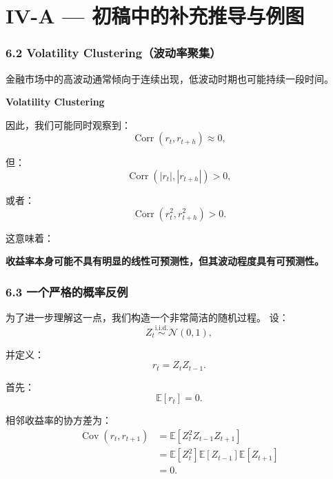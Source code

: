 \hypertarget{part-4-52-0680-iv-a-ux521dux7a3fux4e2dux7684ux8865ux5145ux63a8ux5bfcux4e0eux4f8bux56fe}{%
\section{IV-A --- 初稿中的补充推导与例图}\label{part-4-52-0680-iv-a-ux521dux7a3fux4e2dux7684ux8865ux5145ux63a8ux5bfcux4e0eux4f8bux56fe}}

\hypertarget{part-4-52-0680-volatility-clusteringux6ce2ux52a8ux7387ux805aux96c6}{%
\subsubsection{6.2 Volatility Clustering（波动率聚集）}\label{part-4-52-0680-volatility-clusteringux6ce2ux52a8ux7387ux805aux96c6}}

金融市场中的高波动通常倾向于连续出现，低波动时期也可能持续一段时间。

\textbf{Volatility Clustering}


因此，我们可能同时观察到：
\[\operatorname{Corr}(r_t,r_{t+h})\approx0,\]

但：
\[\operatorname{Corr}(|r_t|,|r_{t+h}|)>0,\]

或者：
\[\operatorname{Corr}(r_t^2,r_{t+h}^2)>0.\]

这意味着：

\textbf{收益率本身可能不具有明显的线性可预测性，但其波动程度具有可预测性。}

\hypertarget{part-4-52-0680-ux4e00ux4e2aux4e25ux683cux7684ux6982ux7387ux53cdux4f8b}{%
\subsubsection{6.3 一个严格的概率反例}\label{part-4-52-0680-ux4e00ux4e2aux4e25ux683cux7684ux6982ux7387ux53cdux4f8b}}

为了进一步理解这一点，我们构造一个非常简洁的随机过程。 设：
\[Z_t\overset{\mathrm{i.i.d.}}{\sim}\mathcal N(0,1),\]

并定义：
\[r_t=Z_tZ_{t-1}.\]

首先：
\[\mathbb E[r_t]=0.\]

相邻收益率的协方差为：
\[\begin{aligned}
\operatorname{Cov}(r_t,r_{t+1})
&=\mathbb E[Z_t^2Z_{t-1}Z_{t+1}]\\
&=\mathbb E[Z_t^2]
\mathbb E[Z_{t-1}]
\mathbb E[Z_{t+1}]\\
&=0.
\end{aligned}\]

